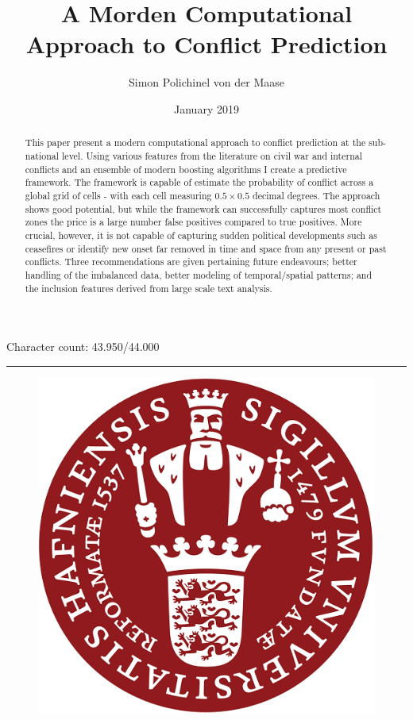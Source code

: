 \documentclass[a4paper]{article}
\title{A Morden Computational Approach to Conflict Prediction}
\author{Simon Polichinel von der Maase}
\date{January 2019}
\begin{document}
	\begin{titlepage}
		\maketitle
		Character count: 43.950/44.000\\
		\noindent\rule{\linewidth}{0.4pt}
		\begin{figure}[h]
			\centering
			\includegraphics[scale=0.32]{KU_logo.png}
		\end{figure}
		\thispagestyle{empty} %
	\end{titlepage}
    \tableofcontents
\pagebreak

\begin{abstract}

This paper present a modern computational approach to conflict prediction at the sub-national level. Using various features from the literature on civil war and internal conflicts and an ensemble of modern boosting algorithms I create a predictive framework. The framework is capable of estimate the probability of conflict across a global grid of cells - with each cell measuring $0.5 \times 0.5$ decimal degrees. The approach shows good potential, but while the framework can successfully captures most conflict zones the price is a large number false positives compared to true positives. More crucial, however, it is not capable of capturing sudden political developments such as ceasefires or identify new onset far removed in time and space from any present or past conflicts. Three recommendations are given pertaining future endeavours; better handling of the imbalanced data, better modeling of temporal/spatial patterns; and the inclusion features derived from large scale text analysis.

\end{abstract}
\pagebreak
\end{document}
